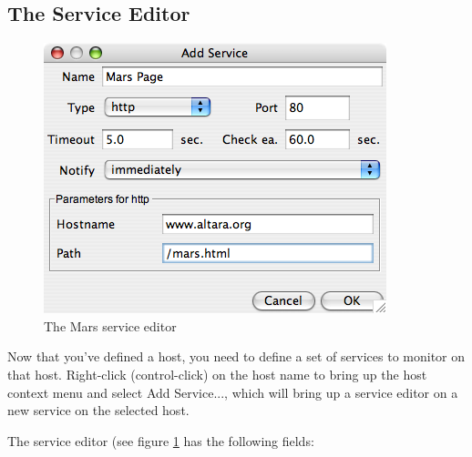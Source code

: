 \documentclass{article}
\newcommand{\guiitem}[1]{{\sf #1}}
\begin{document}
\subsection{The Service Editor}
\begin{figure}
\begin{center}
\includegraphics[scale=0.5]{images/screen_newsvc}
\end{center}
\caption{The Mars service editor}
\label{fig_screen_newsvc}
\end{figure} 

Now that you've defined a host, you need to define a set of services
to monitor on that host. Right-click (control-click) on the host name
to bring up the host context menu and select \guiitem{Add Service...},
which will bring up a service editor on a new service on the selected
host.

The service editor (see figure \ref{fig_screen_newsvc} has the
following fields:
\end{document}
